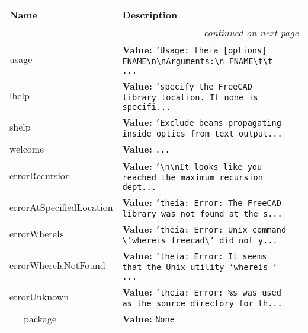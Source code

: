     \vspace{-1cm}
\hspace{\varindent}\begin{longtable}{|p{\varnamewidth}|p{\vardescrwidth}|l}
\cline{1-2}
\cline{1-2} \centering \textbf{Name} & \centering \textbf{Description}& \\
\cline{1-2}
\endhead\cline{1-2}\multicolumn{3}{r}{\small\textit{continued on next page}}\\\endfoot\cline{1-2}
\endlastfoot\raggedright u\-s\-a\-g\-e\- & \raggedright \textbf{Value:} 
{\tt \texttt{'}\texttt{Usage: theia [options] FNAME{\textbackslash}n{\textbackslash}nArguments:{\textbackslash}n  FNAME{\textbackslash}t{\textbackslash}t }\texttt{...}}&\\
\cline{1-2}
\raggedright l\-h\-e\-l\-p\- & \raggedright \textbf{Value:} 
{\tt \texttt{'}\texttt{specify the FreeCAD library location. If none is specifi}\texttt{...}}&\\
\cline{1-2}
\raggedright s\-h\-e\-l\-p\- & \raggedright \textbf{Value:} 
{\tt \texttt{'}\texttt{Exclude beams propagating inside optics from text output}\texttt{...}}&\\
\cline{1-2}
\raggedright w\-e\-l\-c\-o\-m\-e\- & \raggedright \textbf{Value:} 
{\tt \texttt{...}}&\\
\cline{1-2}
\raggedright e\-r\-r\-o\-r\-R\-e\-c\-u\-r\-s\-i\-o\-n\- & \raggedright \textbf{Value:} 
{\tt \texttt{'}\texttt{{\textbackslash}n{\textbackslash}nIt looks like you reached the maximum recursion dept}\texttt{...}}&\\
\cline{1-2}
\raggedright e\-r\-r\-o\-r\-A\-t\-S\-p\-e\-c\-i\-f\-i\-e\-d\-L\-o\-c\-a\-t\-i\-o\-n\- & \raggedright \textbf{Value:} 
{\tt \texttt{'}\texttt{theia: Error: The FreeCAD library was not found at the s}\texttt{...}}&\\
\cline{1-2}
\raggedright e\-r\-r\-o\-r\-W\-h\-e\-r\-e\-I\-s\- & \raggedright \textbf{Value:} 
{\tt \texttt{'}\texttt{theia: Error: Unix command {\textbackslash}'whereis freecad{\textbackslash}' did not y}\texttt{...}}&\\
\cline{1-2}
\raggedright e\-r\-r\-o\-r\-W\-h\-e\-r\-e\-I\-s\-N\-o\-t\-F\-o\-u\-n\-d\- & \raggedright \textbf{Value:} 
{\tt \texttt{'}\texttt{theia: Error: It seems that the Unix utility `whereis ` }\texttt{...}}&\\
\cline{1-2}
\raggedright e\-r\-r\-o\-r\-U\-n\-k\-n\-o\-w\-n\- & \raggedright \textbf{Value:} 
{\tt \texttt{'}\texttt{theia: Error: \%s was used as the source directory for th}\texttt{...}}&\\
\cline{1-2}
\raggedright \_\-\_\-p\-a\-c\-k\-a\-g\-e\-\_\-\_\- & \raggedright \textbf{Value:} 
{\tt None}&\\
\cline{1-2}
\end{longtable}


